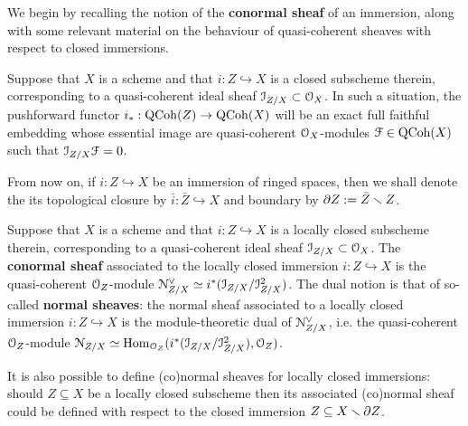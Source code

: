             We begin by recalling the notion of the \textbf{conormal sheaf} of an immersion, along with some relevant material on the behaviour of quasi-coherent sheaves with respect to closed immersions. 
            \begin{lemma} \label{lemma: quasi_coherent_sheaves_on_closed_subschemes}
                \cite[\href{https://stacks.math.columbia.edu/tag/01QY}{Tag 01QY}]{stacks} Suppose that $X$ is a scheme and that $i: Z \hookrightarrow X$ is a closed subscheme therein, corresponding to a quasi-coherent ideal sheaf $\mathcal{I}_{Z/X} \subset \mathcal{O}_X$. In such a situation, the pushforward functor $i_*: \mathrm{QCoh}(Z)\to \mathrm{QCoh}(X)$ will be an exact full faithful embedding whose essential image are quasi-coherent $\mathcal{O}_X$-modules $\mathcal{F} \in \mathrm{QCoh}(X)$ such that $\mathcal{I}_{Z/X} \mathcal{F} = 0$.
            \end{lemma}
            \begin{convention} \label{conv: closures_and_boundaries}
                From now on, if $i: Z \hookrightarrow X$ be an immersion of ringed spaces, then we shall denote the its topological closure by $\bar{i}: \bar{Z} \hookrightarrow X$ and boundary by $\partial Z := \bar{Z} \smallsetminus Z$. 
            \end{convention}
            \begin{definition} \label{def: (co)normal_sheaves_of_closed_immersions}
                Suppose that $X$ is a scheme and that $i: Z \hookrightarrow X$ is a locally closed subscheme therein, corresponding to a quasi-coherent ideal sheaf $\mathcal{I}_{Z/X} \subset \mathcal{O}_X$. The \textbf{conormal sheaf} associated to the locally closed immersion $i: Z \hookrightarrow X$ is the quasi-coherent $\mathcal{O}_Z$-module $\mathcal{N}_{Z/X}^{\vee} \simeq i^*(\mathcal{I}_{Z/X}/\mathcal{I}_{Z/X}^2)$. The dual notion is that of so-called \textbf{normal sheaves}: the normal sheaf associated to a locally closed immersion $i: Z \hookrightarrow X$ is the module-theoretic dual of $\mathcal{N}_{Z/X}^{\vee}$, i.e. the quasi-coherent $\mathcal{O}_Z$-module $\mathcal{N}_{Z/X} \simeq \mathrm{Hom}_{\mathcal{O}_Z}(i^*(\mathcal{I}_{Z/X}/\mathcal{I}_{Z/X}^2), \mathcal{O}_Z)$. 
                
                It is also possible to define (co)normal sheaves for locally closed immersions: should $Z \subseteq X$ be a locally closed subscheme then its associated (co)normal sheaf could be defined with respect to the closed immersion $Z \subseteq X \smallsetminus \partial Z$.
            \end{definition} 
